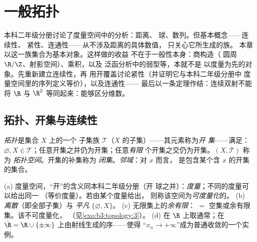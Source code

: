 \chapter{一般拓扑}\label{ch:b3:topology}

本科二年级分册讨论了度量空间中的分析：距离、
球、数列。但基本概念——连续性、
紧性、连通性——从不涉及距离的具体数值，
只关心它所生成的\emph{}族。
本章以这一族集合为基本对象。这样做的收益
不在于一般性本身：商构造（
圆周 $\R/\Z$、射影空间）、乘积，以及
泛函分析中的弱型等，本就不是
以度量为先的对象。先重新建立连续性，再
用开覆盖讨论紧性（并证明它与本科二年级分册中
度量空间里的序列定义等价），以及连通性——
最后以一条定理作结：连续双射不能将
$\R$ 与 $\R^2$ 等同起来：能够区分维数。

\section{拓扑、开集与连续性}

\begin{definition}\label{def:b3:topology:topology}
\emph{拓扑}是集合 $X$ 上的一个
子集族 $\mathcal T$（$X$ 的子集）——其元素称为\emph{开
集}——满足：$\varnothing, X \in
\mathcal T$；任意开集之并仍为开集；任意\emph{有限}
个开集之交仍为开集。$(X, \mathcal T)$ 称为
\emph{拓扑空间}。开集的补集称为
\emph{闭集}。\emph{邻域}：对 $x$ 而言，
是包含某个含 $x$ 的开集的集合。
\end{definition}

\begin{example}\label{ex:b3:topology:examples}
(a) 度量空间，“开”的含义同本科二年级分册（开
球之并）：\emph{度量}；不同的度量可以给出同一
（等价度量）。若由某个度量给出，
则称该空间为\emph{可度量化}的。
(b) \emph{离散}（即全部子集）与
\emph{平凡} $\{\varnothing, X\}$。
(c) 无限集上的\emph{余有限}： $=$
空集或余有限集。该不可度量化，
（见\cref{exo:b3:topology:3}）。
(d) 在 $\R$ 上取通常；在 $\bar\R = \R \cup
\{\pm\infty\}$ 上由射线生成的序——使得
“$x_n \to +\infty$”成为普通收敛的一个实例。
\end{example}

